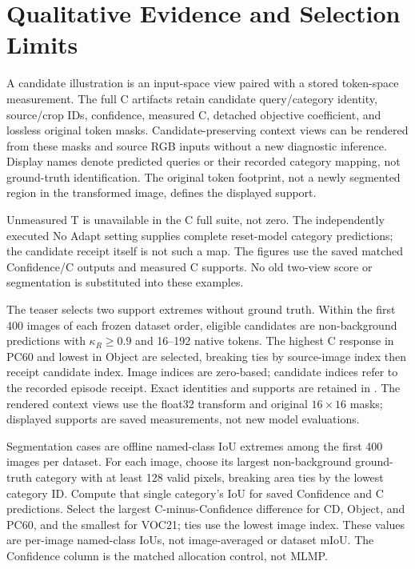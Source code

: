 

\section{Qualitative Evidence and Selection Limits}
\label{app:figures}
A candidate illustration is an input-space view paired with a stored token-space measurement. The full C artifacts retain candidate query/category identity, source/crop IDs, confidence, measured C, detached objective coefficient, and lossless original token masks. Candidate-preserving context views can be rendered from these masks and source RGB inputs without a new diagnostic inference. Display names denote predicted queries or their recorded category mapping, not ground-truth identification. The original token footprint, not a newly segmented region in the transformed image, defines the displayed support.

Unmeasured T is unavailable in the C full suite, not zero. The independently executed No Adapt setting supplies complete reset-model category predictions; the candidate receipt itself is not such a map. The figures use the saved matched Confidence/C outputs and measured C supports. No old two-view score or segmentation is substituted into these examples.

The teaser selects two support extremes without ground truth. Within the first 400 images of each frozen dataset order, eligible candidates are non-background predictions with $\kappa_R\geq0.9$ and 16--192 native tokens. The highest C response in PC60 and lowest in Object are selected, breaking ties by source-image index then receipt candidate index. Image indices are zero-based; candidate indices refer to the recorded episode receipt. Exact identities and supports are retained in . The rendered context views use the float32 transform and original $16\times16$ masks; displayed supports are saved measurements, not new model evaluations.

Segmentation cases are offline named-class IoU extremes among the first 400 images per dataset. For each image, choose its largest non-background ground-truth category with at least 128 valid pixels, breaking area ties by the lowest category ID. Compute that single category's IoU for saved Confidence and C predictions. Select the largest C-minus-Confidence difference for CD, Object, and PC60, and the smallest for VOC21; ties use the lowest image index. These values are per-image named-class IoUs, not image-averaged or dataset mIoU. The Confidence column is the matched allocation control, not MLMP.

